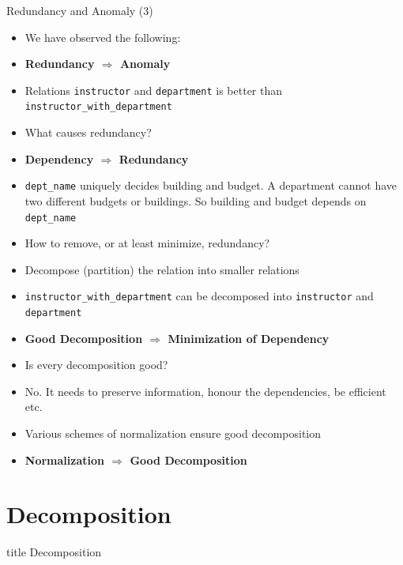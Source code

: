 \documentclass[aspectratio=169, xcolor=dvipsnames]{beamer}
\begin{document}
\begin{frame}{Redundancy and Anomaly (3)}
    \begin{itemize}[<+->]
        \item We have observed the following:
        \item \textbf{Redundancy $\Rightarrow$ Anomaly}
        \item Relations \texttt{instructor} and \texttt{department} is better than \texttt{instructor\_with\_department}
        \item What causes redundancy?
        \item \textbf{Dependency $\Rightarrow$ Redundancy}
        \item \texttt{dept\_name} uniquely decides building and budget. A department cannot have two different budgets or buildings. So building and budget depends on \texttt{dept\_name}
        \item How to remove, or at least minimize, redundancy?
        \item Decompose (partition) the relation into smaller relations
        \item \texttt{instructor\_with\_department} can be decomposed into \texttt{instructor} and \texttt{department}
        \item \textbf{Good Decomposition $\Rightarrow$ Minimization of Dependency}
        \item Is every decomposition good?
        \item No. It needs to preserve information, honour the dependencies, be efficient etc.
        \item Various schemes of normalization ensure good decomposition
        \item \textbf{Normalization $\Rightarrow$ Good Decomposition}
    \end{itemize}
\end{frame}

\section{Decomposition}
\begin{frame}
  \vfill
  \centering
  \begin{beamercolorbox}[sep=8pt,center,shadow=true,rounded=true]{title}
    Decomposition\par%
  \end{beamercolorbox}
  \vfill
\end{frame}
\end{document}
